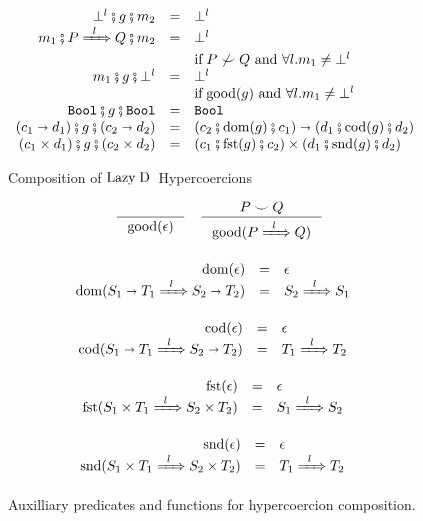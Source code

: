 \documentclass[runningheads]{llncs}
\newcommand{\infr}[2]{\inference{#1}{#2}}
\newcommand{\sidecond}[1]{\text{if}\;#1}
\newcommand{\figequalto}[3]{#1 & = & #2 & #3 \\}
\newcommand{\LD}{\ensuremath{\text{Lazy\;D}}}
\newcommand{\Pbool}[0]{\ensuremath{\mathtt{Bool}}}
\newcommand{\Pfunc}[2]{\ensuremath{#1 \shortrightarrow #2}}
\newcommand{\Pprod}[2]{\ensuremath{#1 \times #2}}
\newcommand{\ccast}[3]{#1 \xRightarrow[]{\enskip #2 \enskip} #3}
\newcommand{\hcmbool}[0]{\Pbool}
\newcommand{\hcmfunc}[2]{\Pfunc{#1}{#2}}
\newcommand{\hcmprod}[2]{\Pprod{#1}{#2}}
\newcommand{\hcmfail}[1]{\ensuremath{\bot^l}}
\newcommand{\gnone}{\ensuremath{\epsilon}}
\newcommand{\gsome}[3]{\ccast{#1}{#2}{#3}}
\newcommand{\composegap}[3]{\ensuremath{#1 \fatsemi #2 \fatsemi #3}}
\newcommand{\dom}[1]{\ensuremath{\mathrm{dom}(#1)}}
\newcommand{\cod}[1]{\ensuremath{\mathrm{cod}(#1)}}
\newcommand{\fst}[1]{\ensuremath{\mathrm{fst}(#1)}}
\newcommand{\snd}[1]{\ensuremath{\mathrm{snd}(#1)}}
\newcommand{\shallowlyconsistent}[2]{\ensuremath{#1\smile#2}}
\newcommand{\notshallowlyconsistent}[2]{\ensuremath{#1\not\smile#2}}
\newcommand{\goodgap}[1]{\ensuremath{\mathrm{good}(#1)}}
\begin{document}
\begin{figure}[tp]
\fbox{$\composegap{m}{g}{m} = m$}
\[ 
\begin{array}{rclr}
\figequalto{\composegap{\hcmfail{l}}{g}{m_2}}{
	\hcmfail{l}
}{}
\figequalto{\composegap{m_1}{\gsome{P}{l}{Q}}{m_2}}{
	\hcmfail{l}
}{\\&&\sidecond{
		\notshallowlyconsistent{P}{Q}
		\text{ and } \forall l. m_1 \neq \hcmfail{l}
}}
\figequalto{\composegap{m_1}{g}{\hcmfail{l}}}{
	\hcmfail{l}
}{\\&&\sidecond{
		\goodgap{g}
		\text{ and } \forall l. m_1 \neq \hcmfail{l}}}
\figequalto{\composegap{\hcmbool}{g}{\hcmbool}}{
	\hcmbool
}{}
\figequalto{
	\composegap{
		(\hcmfunc{c_1}{d_1})}{
		g}{
		(\hcmfunc{c_2}{d_2})}
}{
	\hcmfunc{
		(\composegap{c_2}{\dom{g}}{c_1})}{
		(\composegap{d_1}{\cod{g}}{d_2})}
}{}
\figequalto{
	\composegap{
		(\hcmprod{c_1}{d_1})}{
		g}{
		(\hcmprod{c_2}{d_2})}
}{
	\hcmprod{
		(\composegap{c_1}{\fst{g}}{c_2})}{
		(\composegap{d_1}{\snd{g}}{d_2})}
}{}
\end{array}
\]	

	\caption{Composition of \LD\ Hypercoercions}
	\label{fig:LazyD-Hypercoercions-composition}
\end{figure}


\begin{figure}[tp]
\begin{gather*}
\infr{}{\goodgap{\gnone}} \quad
\infr{\shallowlyconsistent{P}{Q}}{\goodgap{\gsome{P}{l}{Q}}}
\end{gather*}

\[
\begin{array}{rclr}
\figequalto{\dom{\gnone}}{\gnone}{}
\figequalto{\dom{\gsome{\Pfunc{S_1}{T_1}}{l}{\Pfunc{S_2}{T_2}}}}{
	\gsome{S_2}{l}{S_1}
}{}
\end{array}
\]

\[
\begin{array}{rclr}
\figequalto{\cod{\gnone}}{\gnone}{}
\figequalto{\cod{\gsome{\Pfunc{S_1}{T_1}}{l}{\Pfunc{S_2}{T_2}}}}{
	\gsome{T_1}{l}{T_2}
}{}
\end{array}
\]

\[
\begin{array}{rclr}
\figequalto{\fst{\gnone}}{\gnone}{}
\figequalto{\fst{\gsome{\Pprod{S_1}{T_1}}{l}{\Pprod{S_2}{T_2}}}}{
	\gsome{S_1}{l}{S_2}
}{}
\end{array}
\]

\[
\begin{array}{rclr}
\figequalto{\snd{\gnone}}{\gnone}{}
\figequalto{\snd{\gsome{\Pprod{S_1}{T_1}}{l}{\Pprod{S_2}{T_2}}}}{
	\gsome{T_1}{l}{T_2}
}{}
\end{array}
\]
\caption{Auxilliary predicates and functions for hypercoercion composition.}
\label{fig:aux-hypercoercion-composition}
\end{figure}
\end{document}
